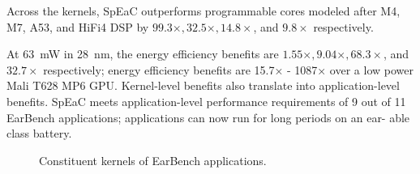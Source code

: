 Across the kernels, SpEaC outperforms programmable cores modeled after M4, M7,
A53, and HiFi4 DSP by \(99.3\times, 32.5\times, 14.8\times\), and \(9.8\times\)
respectively.

At \SI{63}{\milli\watt} in \SI{28}{\nano\meter}, the energy efficiency benefits
are \(1.55\times, 9.04\times, 68.3\times\), and \(32.7\times\) respectively;
energy efficiency benefits are 15.7× - 1087× over a low power Mali T628 MP6
GPU. Kernel-level benefits also translate into application-level benefits.
SpEaC meets application-level performance requirements of 9 out of 11 EarBench
applications; applications can now run for long periods on an ear- able class
battery.


\begin{figure}
  \centering
  
  \caption{\small Constituent kernels of EarBench applications.}
  \label{fig:kernels_breakdown}
\end{figure}


